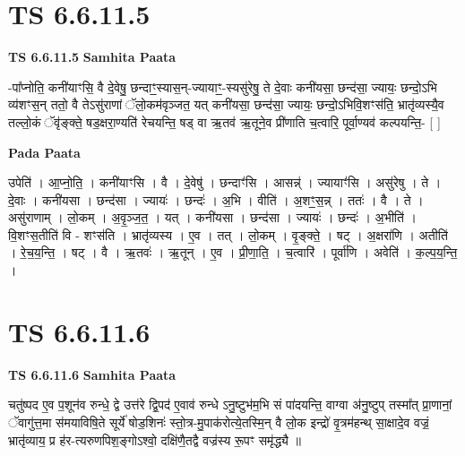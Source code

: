 \documentclass[17pt]{extarticle}
\begin{document}

\section{ TS 6.6.11.5 }

\textbf{TS 6.6.11.5 } \newline
\textbf{Samhita Paata} \newline

-पा᳚प्नोति॒ कनी॑याꣳसि॒ वै दे॒वेषु॒ छन्दाꣳ॒॒स्यास॒न्-ज्यायाꣳ॒॒-स्यसु॑रेषु॒ ते दे॒वाः कनी॑यसा॒ छन्द॑सा॒ ज्यायः॒ छन्दो॒ऽभि व्य॑शꣳस॒न् ततो॒ वै तेऽसु॑राणां ॅलो॒कम॑वृञ्जत॒ यत् कनी॑यसा॒ छन्द॑सा॒ ज्यायः॒ छन्दो॒ऽभिवि॒शꣳस॑ति॒ भ्रातृ॑व्यस्यै॒व तल्लो॒कं ॅवृ॑ङ्क्ते॒ षड॒क्षरा॒ण्यति॑ रेचयन्ति॒ षड् वा ऋ॒तव॑ ऋ॒तूने॒व प्री॑णाति च॒त्वारि॒ पूर्वा॒ण्यव॑ कल्पयन्ति॒- [  ] \newline

\textbf{Pada Paata} \newline

उपेति॑ । आ॒प्नो॒ति॒ । कनी॑याꣳसि । वै । दे॒वेषु॑ । छन्दाꣳ॑सि । आसन्न्॑ । ज्यायाꣳ॑सि ।   असु॑रेषु । ते । दे॒वाः । कनी॑यसा । छन्द॑सा । ज्यायः॑ । छन्दः॑ । अ॒भि । वीति॑ । अ॒शꣳ॒॒स॒न्न् । ततः॑ । वै । ते । असु॑राणाम् । लो॒कम् । अ॒वृ॒ञ्ज॒त॒ । यत् । कनी॑यसा । छन्द॑सा । ज्यायः॑ । छन्दः॑ । अ॒भीति॑ । वि॒शꣳस॒तीति॑ वि - शꣳस॑ति । भ्रातृ॑व्यस्य । ए॒व । तत् । लो॒कम् । वृ॒ङ्क्ते॒ । षट् । अ॒क्षरा॑णि । अतीति॑ । रे॒च॒य॒न्ति॒ । षट् । वै । ऋ॒तवः॑ । ऋ॒तून् । ए॒व । प्री॒णा॒ति॒ । च॒त्वारि॑ । पूर्वा॑णि । अवेति॑ । क॒ल्प॒य॒न्ति॒ ।  \newline





\section{ TS 6.6.11.6 }

\textbf{TS 6.6.11.6 } \newline
\textbf{Samhita Paata} \newline

चतु॑ष्पद ए॒व प॒शून॑व रुन्धे॒ द्वे उत्त॑रे द्वि॒पद॑ ए॒वाव॑ रुन्धे ऽनु॒ष्टुभ॑म॒भि सं पा॑दयन्ति॒ वाग्वा अ॑नु॒ष्टुप् तस्मा᳚त् प्रा॒णानां॒ ॅवागु॑त्त॒मा स॑मयाविषि॒ते सूर्ये॑ षोड॒शिनः॑ स्तो॒त्र-मु॒पाक॑रोत्ये॒तस्मि॒न् वै लो॒क इन्द्रो॑ वृ॒त्रम॑हन्थ् सा॒क्षादे॒व वज्रं॒ भ्रातृ॑व्याय॒ प्र ह॑र-त्यरुणपिश॒ङ्गोऽश्वो॒ दक्षि॑णै॒तद्वै वज्र॑स्य रू॒पꣳ समृ॑द्ध्यै ॥ \newline
\end{document}
